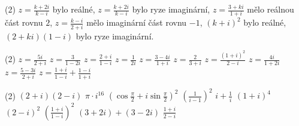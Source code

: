 \documentclass[12pt,a4paper]{article}
\begin{document}
\begin{exercise}
        \begin{tasks}(2)
            \task $\displaystyle z=\frac{k+2i}{k-i}$ bylo reálné,
            \task $\displaystyle z=\frac{k+2i}{k-i}$ bylo ryze imaginární,
            \task $\displaystyle z=\frac{3+ki}{1+i}$ mělo reálnou část rovnu $2$,
            \task $\displaystyle z=\frac{k-i}{2+i}$ mělo imaginární část rovnu $-1$,
            \task $(k+i)^2$ bylo reálné,
            \task $(2+ki)(1-i)$ bylo ryze imaginární.
        \end{tasks}
\end{exercise}


\begin{exercise}
    \begin{tasks}(2)
        \task $\displaystyle z=\frac{5i}{2+i}$
        \task $\displaystyle z=\frac{3}{1-2i}$
        \task $\displaystyle z=\frac{2+i}{1-i}$
        \task $\displaystyle z=\frac{1}{2i}$
        \task $\displaystyle z=\frac{3-4i}{1+i}$
        \task $\displaystyle z=\frac{2}{3+i}$
        \task $\displaystyle z=\frac{(1+i)^2}{2-i}$
        \task $\displaystyle z=\frac{4i}{1+2i}$
        \task $\displaystyle z=\frac{5-3i}{2+i}$
        \task $\displaystyle z=\frac{1+i}{1-i}+\frac{1-i}{1+i}$
    \end{tasks}
\end{exercise}


\begin{exercise}
    \begin{tasks}(2)
        \task $(2+i)(2-i)$
        \task $\pi\cdot i^{16}$
        \task $\displaystyle \left(\cos\frac{\pi}{2}+i\sin\frac{\pi}{2}\right)^2$
        \task $\displaystyle \left(\frac{1}{i-1}\right)^2$
        \task $\displaystyle i+\frac{1}{i}$
        \task $(1+i)^4$
        \task $(2-i)^2$
        \task $\displaystyle \left(\frac{1+i}{1-i}\right)^2$
        \task $(3+2i)+(3-2i)$
        \task $\displaystyle \frac{1+i}{2-i}$
    \end{tasks}
\end{exercise}
\end{document}
